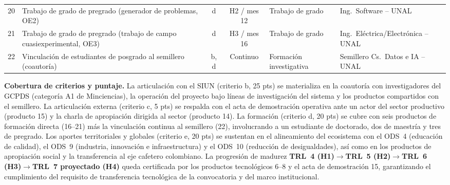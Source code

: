 \begin{table}[h]
\begin{tabularx}{\textwidth}{@{}l X c c l X@{}}
20 & Trabajo de grado de pregrado (generador de problemas, OE2)
  & d & H2 / mes 12 & Trabajo de grado
  & Ing.\ Software -- UNAL \\

21 & Trabajo de grado de pregrado (trabajo de campo cuasiexperimental, OE3)
  & d & H3 / mes 16 & Trabajo de grado
  & Ing.\ Eléctrica/Electrónica -- UNAL \\

22 & Vinculación de estudiantes de posgrado al semillero (coautoría)
  & b, d & Continuo & Formación investigativa
  & Semillero Cs.\ Datos e IA -- UNAL \\

\bottomrule
\end{tabularx}
\end{table}

\medskip

\noindent\textbf{Cobertura de criterios y puntaje.}
La articulación con el SIUN (criterio b, 25 pts) se materializa en la
coautoría con investigadores del GCPDS (categoría A1 de Minciencias), la
operación del proyecto bajo líneas de investigación del sistema y los productos
compartidos con el semillero. La articulación externa (criterio c, 5 pts) se
respalda con el acta de demostración operativa ante un actor del sector
productivo (producto 15) y la charla de apropiación dirigida al sector (producto
14). La formación (criterio d, 20 pts) se cubre con seis productos de formación
directa (16--21) más la vinculación continua al semillero (22), involucrando a
un estudiante de doctorado, dos de maestría y tres de pregrado. Los aportes
territoriales y globales (criterio e, 20 pts) se sustentan en el alineamiento
del ecosistema con el ODS~4 (educación de calidad), el ODS~9 (industria,
innovación e infraestructura) y el ODS~10 (reducción de desigualdades), así como
en los productos de apropiación social y la transferencia al eje cafetero
colombiano. La progresión de madurez \textbf{TRL~4 (H1)$\to$TRL~5 (H2)$\to$TRL~6
(H3)$\to$TRL~7 proyectado (H4)} queda certificada por los productos tecnológicos
6--8 y el acta de demostración 15, garantizando el cumplimiento del requisito de
transferencia tecnológica de la convocatoria y del marco institucional.
